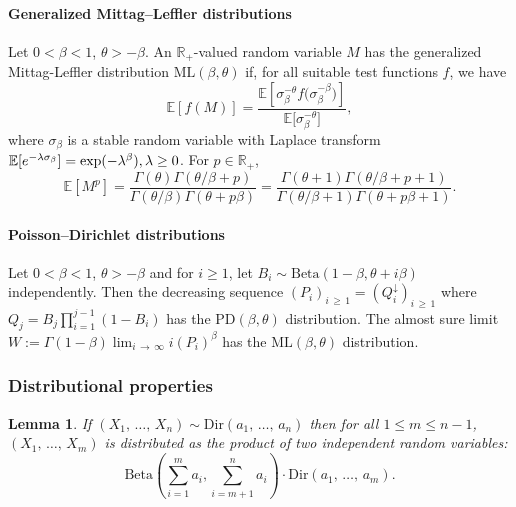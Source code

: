 \documentclass[10pt]{amsart}
\newtheorem{lemm}[theo]{Lemma}\newtheorem{prop}[theo]{Proposition}\newtheorem{coro}[theo]{Corollary}\newtheorem{conj}[theo]{Conjecture}
\theoremstyle{definition}\newtheorem{defi}[theo]{Definition}\newtheorem{rema}[theo]{Remark}\newtheorem{exam}[theo]{Example}\newtheorem{exem}[theo]{Example}\newtheorem{nota}[theo]{Notation}
\newcommand{\Betal}{\mathrm{Beta}}
\newcommand{\ML}{\mathrm{ML}}
\newcommand{\PD}{\mathrm{PD}}
\newcommand{\Dir}{\mathrm{Dir}}
\newcommand{\R}{\mathbb{R}}
\newcommand{\bbE}{\mathbb{E}}
\begin{document}

\paragraph{Generalized Mittag--Leffler distributions} 
Let $0<\beta<1$, $\theta>-\beta$. An $\R_+$-valued random variable $M$ has the {generalized Mittag-Leffler distribution} $\ML(\beta,\theta)$ if, for all suitable test functions $f$, we have
\begin{equation}\label{def:ML}
\bbE\left[f(M)\right]= \frac{\bbE\left[\sigma_{\beta}^{-\theta}f\big(\sigma_{\beta}^{-\beta}\big)\right]}{\bbE\big[\sigma_{\beta}^{-\theta}\big]},
\end{equation}
where $\sigma_{\beta}$ is a stable random variable with Laplace transform $\bbE[e^{-\lambda \sigma_{\beta}}] = \exp(-\lambda^{\beta}),\lambda \linebreak\geq 0$. For $p \in \R_+$,
\[
\bbE\left[M^p\right]=\frac{\Gamma(\theta) \Gamma(\theta/\beta + p)}{\Gamma(\theta/\beta) \Gamma(\theta + p \beta)}=\frac{\Gamma(\theta+1) \Gamma(\theta/\beta + p+1)}{\Gamma(\theta/\beta+1) \Gamma(\theta + p \beta+1)}.
\]


\paragraph{Poisson--Dirichlet distributions}
Let $0<\beta<1$, $\theta>-\beta$ and for $i \ge 1$, let $B_i \sim \Betal(1-\beta, \theta + i \beta)$ independently. Then the decreasing sequence $(P_i)_{i\,\geq\,1}=(Q_i^{\downarrow})_{i\,\ge\,1}$ where $Q_j = B_j \prod_{i=1}^{j-1} (1 - B_i)$ has the $\PD(\beta,\theta)$ distribution. The almost sure limit $ W := \Gamma(1 - \beta) \lim_{i\,\to\,\infty} i (P_i)^{\beta}$ has the $\ML(\beta,\theta)$ distribution.

\subsubsection{Distributional properties}

\begin{lemm}\label{lem:DirichletBeta}
If $(X_1,\,\ldots,\,X_n) \sim \Dir(a_1,\,\ldots,\,a_n)$ then for all $1 \leq m \leq n-1$, $ (X_1,\,\ldots,\,X_m) $ is distributed as the product of two independent random variables:
\[
\Betal\left(\sum_{i=1}^m a_i,\sum_{i=m+1}^n a_i\right) \cdot \Dir(a_1,\,\ldots,\,a_m).
\]
\end{lemm}
\end{document}
